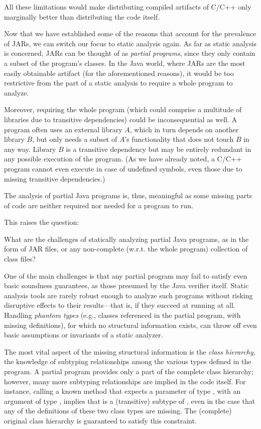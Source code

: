 All these limitations would make distributing compiled artifacts of
C/C++ only marginally better than distributing the code itself.

Now that we have established some of the reasons that account for the
prevalence of JARs, we can switch our focus to static analysis
again. As far as static analysis is concerned, JARs can be thought of
as \emph{partial programs}, since they only contain a subset of the
program's classes. In the Java world, where JARs are the most easily
obtainable artifact (for the aforementioned reasons), it would be too
restrictive from the part of a static analysis to require a whole
program to analyze.

Moreover, requiring the whole program (which could comprise a
multitude of libraries due to transitive dependencies) could be
inconsequential as well. A program often uses an external library
\(A\), which in turn depends on another library \(B\), but only needs
a subset of \(A\)'s functionality that does not touch \(B\) in any
way. Library \(B\) is a transitive dependency but may be entirely
redundant in any possible execution of the program. (As we have
already noted, a C/C++ program cannot even execute in case of
undefined symbols, even those due to missing transitive dependencies.)
\begin{displayquote}
  The analysis of partial Java programs is, thus, meaningful as some
  missing parts of code are neither required nor needed for a program
  to run.
\end{displayquote}

This raises the question:
\begin{displayquote}
  What are the challenges of statically analyzing partial Java
  programs, as in the form of JAR files, or any non-complete
  (w.r.t. the whole program) collection of class files?
\end{displayquote}

One of the main challenges is that any partial program may fail to
satisfy even basic soundness guarantees, as those presumed by the Java
verifier itself. Static analysis tools are rarely robust enough to
analyze such programs without risking disruptive effects to
their results---that is, if they succeed at running at all. Handling
\emph{phantom types} (e.g., classes referenced in the partial program,
with missing definitions), for which no structural information exists,
can throw off even basic assumptions or invariants of a static
analyzer.

The most vital aspect of the missing structural information is the
\emph{class hierarchy}, the knowledge of subtyping relationships among
the various types defined in the program. A partial program provides
only a part of the complete class hierarchy; however, many more
subtyping relationships are implied in the code itself. For instance,
calling a known method that expects a parameter of type , with
an argument of type , implies that  is a
(transitive) subtype of , even in the case that any of the
definitions of these two class types are missing. The (complete)
original class hierarchy is guaranteed to satisfy this
constraint.

